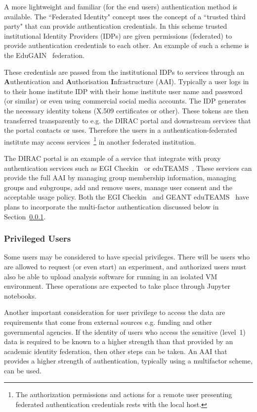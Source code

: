 \documentclass[12pt,a4paper]{article}
\begin{document}
A more lightweight and familiar (for the end users) authentication method is available.
The ``Federated Identity" concept uses the concept of a ``trusted third party" that can provide authentication credentials.
In this scheme trusted institutional Identity Providers (IDPs) are given permissions (federated) to provide authentication credentials to each other. 
An example of such a scheme is the EduGAIN~\cite{edugain} federation.

These credentials are passed from the institutional IDPs to services 
through an {\bf A}uthentication and {\bf A}uthorisation {\bf I}nfrastructure (AAI).
Typically a user logs in to their home institute IDP with their home institute user name and password (or similar) or even using commercial social media accounts.
The IDP generates the necessary identity tokens (X.509 certificates or other).  
These tokens are then transferred transparently to e.g. the DIRAC portal and downstream services that the portal contacts or uses.
Therefore the users in a authentication-federated institute may access services~\footnote{The authorization permissions and actions for a remote user presenting federated authentication credentials rests with the local host.} in another federated institution.

The DIRAC portal is an example of a service that integrate with proxy authentication services such as EGI Checkin~\cite{egi-checkin} or eduTEAMS~\cite{eduteams}.
These services can provide the full AAI by managing group membership information, managing groups and subgroups, add and remove users, manage user consent and the acceptable usage policy.
Both the EGI Checkin~\cite{egi-checkin} and GEANT eduTEAMS~\cite{eduteams} have plans to incorporate the multi-factor authentication discussed below in Section~\ref{ssec:high}.

\subsubsection{Privileged Users}
\label{ssec:high}

Some \EC users may be considered to have special privileges. 
There will be users who are allowed to request (or even start) an experiment, and authorized users must also be able to upload analysis software for running in an isolated VM environment. These operations are expected to take place through Jupyter~\cite{jupyter} notebooks.

Another important consideration for user privilege to access the \ED data are requirements that come from external sources e.g. funding and other governmental agencies.
If the identity of users who access the sensitive (level~1) \ED data is required to be known to a higher strength than that provided by an academic identity federation, then other steps can be taken.
An AAI that provides a higher strength of authentication, typically using a multifactor scheme, can be used.
\end{document}
